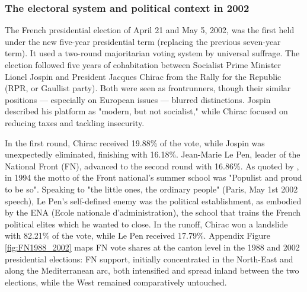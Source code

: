 \subsubsection{The electoral system and political context in 2002}

The French presidential election of April 21 and May 5, 2002, was the first held under the new five-year presidential term (replacing the previous seven-year term). It used a two-round majoritarian voting system by universal suffrage. The election followed five years of cohabitation between Socialist Prime Minister Lionel Jospin and President Jacques Chirac from the Rally for the Republic (RPR, or Gaullist party). Both were seen as frontrunners, though their similar positions — especially on European issues — blurred distinctions. Jospin described his platform as "modern, but not socialist," while Chirac focused on reducing taxes and tackling insecurity.

In the first round, Chirac received 19.88\% of the vote, while Jospin was unexpectedly eliminated, finishing with 16.18\%. Jean-Marie Le Pen, leader of the National Front (FN), advanced to the second round with 16.86\%. As quoted by \cite{Mayer2005}, in 1994 the motto of the Front national's summer school was "Populist and proud to be so". Speaking to "the little ones, the ordinary people" (Paris, May 1st 2002 speech), Le Pen's self-defined enemy was the political establishment, as embodied by the ENA (Ecole nationale d'administration), the school that trains the French political elites which he wanted to close. In the runoff, Chirac won a landslide with 82.21\% of the vote, while Le Pen received 17.79\%. Appendix Figure \ref{fig:FN1988_2002} maps FN vote shares at the canton level in the 1988 and 2002 presidential elections: FN support, initially concentrated in the North-East and along the Mediterranean arc, both intensified and spread inland between the two elections, while the West remained comparatively untouched.
